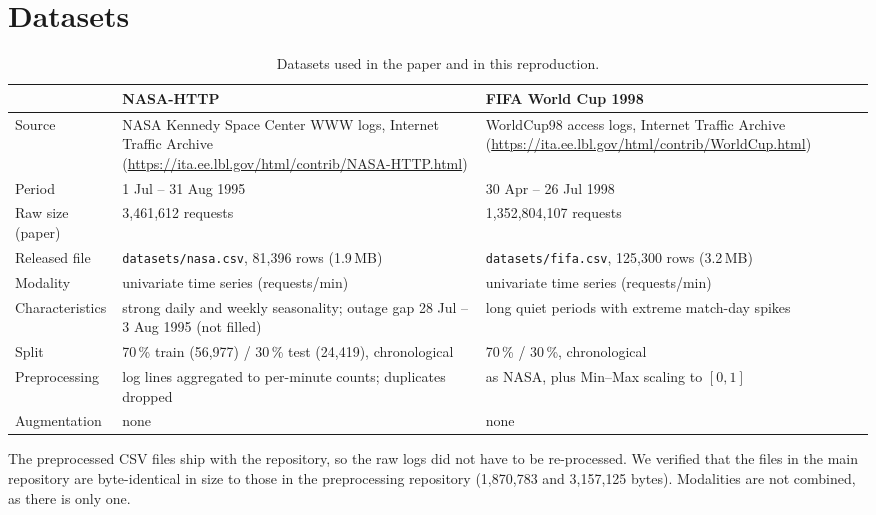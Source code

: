 \documentclass[11pt,a4paper]{article}
\begin{document}
\section{Datasets}
\begin{table}[h]\centering\small
\caption{Datasets used in the paper and in this reproduction.}\label{tab:data}
\begin{tabularx}{\textwidth}{@{}lLL@{}}\toprule
 & NASA-HTTP & FIFA World Cup 1998 \\\midrule
Source & NASA Kennedy Space Center WWW logs, Internet Traffic Archive (\url{https://ita.ee.lbl.gov/html/contrib/NASA-HTTP.html}) & WorldCup98 access logs, Internet Traffic Archive (\url{https://ita.ee.lbl.gov/html/contrib/WorldCup.html}) \\
Period & 1 Jul -- 31 Aug 1995 & 30 Apr -- 26 Jul 1998 \\
Raw size (paper) & 3{,}461{,}612 requests & 1{,}352{,}804{,}107 requests \\
Released file & \texttt{datasets/nasa.csv}, 81{,}396 rows (1.9\,MB) & \texttt{datasets/fifa.csv}, 125{,}300 rows (3.2\,MB) \\
Modality & univariate time series (requests/min) & univariate time series (requests/min) \\
Characteristics & strong daily and weekly seasonality; outage gap 28 Jul -- 3 Aug 1995 (not filled) & long quiet periods with extreme match-day spikes \\
Split & 70\,\% train (56{,}977) / 30\,\% test (24{,}419), chronological & 70\,\% / 30\,\%, chronological \\
Preprocessing & log lines aggregated to per-minute counts; duplicates dropped & as NASA, plus Min--Max scaling to $[0,1]$ \\
Augmentation & none & none \\
\bottomrule\end{tabularx}
\end{table}
The preprocessed CSV files ship with the repository, so the raw logs did not have to be re-processed. We verified that the files in the main repository are byte-identical in size to those in the preprocessing repository (1{,}870{,}783 and 3{,}157{,}125 bytes). Modalities are not combined, as there is only one.

\end{document}
